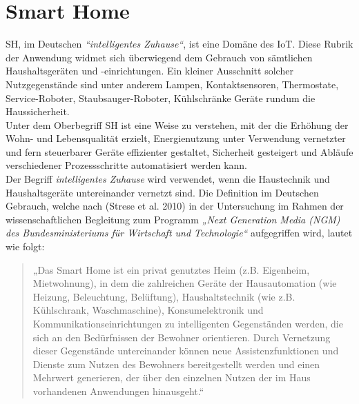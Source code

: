 
\section{Smart Home}
\label{sec:smartHome}
    \acl{SH}, im Deutschen \textit{“intelligentes Zuhause“}, ist eine Domäne des \acs{IoT}. 
    Diese Rubrik der Anwendung widmet sich überwiegend dem Gebrauch von sämtlichen Haushaltsgeräten 
    und -einrichtungen. Ein kleiner Ausschnitt solcher Nutzgegenstände sind unter anderem Lampen, Kontaktsensoren, 
    Thermostate, Service-Roboter, Staubsauger-Roboter, Kühlschränke Geräte rundum die Haussicherheit. 
    \\ 
    Unter dem Oberbegriff \acl{SH} ist eine Weise zu verstehen, mit der die Erhöhung der Wohn- und Lebensqualität erzielt, 
    Energienutzung unter Verwendung vernetzter und fern steuerbarer Geräte effizienter gestaltet, Sicherheit gesteigert 
    und Abläufe verschiedener Prozessschritte automatisiert werden kann.
    \\ 
    Der Begriff \textit{intelligentes Zuhause} wird verwendet, wenn die Haustechnik und Haushaltsgeräte untereinander 
    vernetzt sind. Die Definition im Deutschen Gebrauch, welche nach (Strese et al. 2010) in der Untersuchung im Rahmen 
    der wissenschaftlichen Begleitung zum Programm \textit{„Next Generation Media (NGM) des Bundesministeriums für Wirtschaft und Technologie“} 
    aufgegriffen wird, lautet wie folgt: 
    \begin{quote}
        „Das Smart Home ist ein privat genutztes Heim (z.B. Eigenheim, Mietwohnung), in dem die zahlreichen Geräte der 
        Hausautomation (wie Heizung, Beleuchtung, Belüftung), Haushaltstechnik (wie z.B. Kühlschrank, Waschmaschine), 
        Konsumelektronik und Kommunikationseinrichtungen zu intelligenten Gegenständen werden, die sich an den 
        Bedürfnissen der Bewohner orientieren. Durch Vernetzung dieser Gegenstände untereinander können neue 
        Assistenzfunktionen und Dienste zum Nutzen des Bewohners bereitgestellt werden und einen Mehrwert 
        generieren, der über den einzelnen Nutzen der im Haus vorhandenen Anwendungen hinausgeht.“ \cite{strese.2010m}
    \end{quote}
